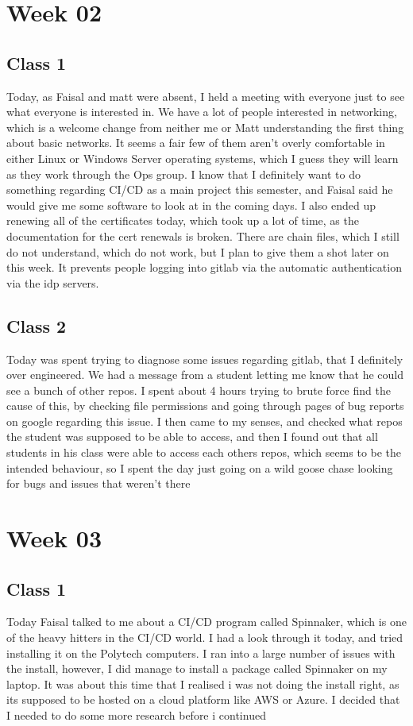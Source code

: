 \documentclass{article}
\begin{document}
\section{Week 02}
\subsection{Class 1}
Today, as Faisal and matt were absent, I held a meeting with everyone just to see what everyone is interested in. We have
a lot of people interested in networking, which is a welcome change from neither me or Matt understanding the first thing about
basic networks. It seems a fair few of them aren't overly comfortable in either Linux or Windows Server operating systems, which
I guess they will learn as they work through the Ops group. I know that I definitely want to do something regarding CI/CD as a main
project this semester, and Faisal said he would give me some software to look at in the coming days. I also ended up renewing all of
the certificates today, which took up a lot of time, as the documentation for the cert renewals is broken. There are chain files, which
I still do not understand, which do not work, but I plan to give them a shot later on this week.  It prevents people logging into gitlab
via the automatic authentication via the idp servers. 
\subsection{Class 2}
Today was spent trying to diagnose some issues regarding gitlab, that I definitely over engineered. We had a message from a student
letting me know that he could see a bunch of other repos. I spent about 4 hours trying to brute force find the cause of this, by checking
file permissions and going through pages of bug reports on google regarding this issue. I then came to my senses, and checked what repos
the student was supposed to be able to access, and then I found out that all students in his class were able to access each others repos, 
which seems to be the intended behaviour, so I spent the day just going on a wild goose chase looking for bugs and issues that weren't there

\section{Week 03}
\subsection{Class 1}
Today Faisal talked to me about a CI/CD program called Spinnaker, which is one of the heavy hitters in the CI/CD world. I had a look
through it today, and tried installing it on the Polytech computers. I ran into a large number of issues with the install, however, I did
manage to install a package called Spinnaker on my laptop. It was about this time that I realised i was not doing the install right, as its
supposed to be hosted on a cloud platform like AWS or Azure. I decided that I needed to do some more research before i continued
\end{document}
